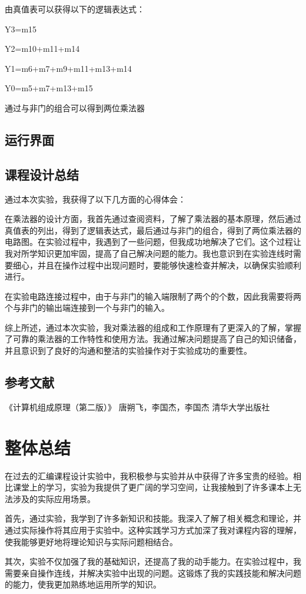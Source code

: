 \documentclass[UTF8,12pt]{article}
\begin{document}
由真值表可以获得以下的逻辑表达式：

Y3=m15

Y2=m10+m11+m14

Y1=m6+m7+m9+m11+m13+m14

Y0=m5+m7+m13+m15

通过与非门的组合可以得到两位乘法器

\subsection{运行界面}

\subsection{课程设计总结}
通过本次实验，我获得了以下几方面的心得体会：

在乘法器的设计方面，我首先通过查阅资料，了解了乘法器的基本原理，然后通过真值表的列出，得到了逻辑表达式，最后通过与非门的组合，得到了两位乘法器的电路图。在实验过程中，我遇到了一些问题，但我成功地解决了它们。这个过程让我对所学知识更加牢固，提高了自己解决问题的能力。我也意识到在实验连线时需要细心，并且在操作过程中出现问题时，要能够快速检查并解决，以确保实验顺利进行。

在实验电路连接过程中，由于与非门的输入端限制了两个的个数，因此我需要将两个与非门的输出端连接到一个与非门的输入。

综上所述，通过本次实验，我对乘法器的组成和工作原理有了更深入的了解，掌握了可靠的乘法器的工作特性和使用方法。我通过解决问题提高了自己的知识储备，并且意识到了良好的沟通和整洁的实验操作对于实验成功的重要性。

\subsection{参考文献}
《计算机组成原理（第二版）》  唐朔飞，李国杰，李国杰   清华大学出版社

\section{整体总结}
在过去的汇编课程设计实验中，我积极参与实验并从中获得了许多宝贵的经验。相比课堂上的学习，实验为我提供了更广阔的学习空间，让我接触到了许多课本上无法涉及的实际应用场景。

首先，通过实验，我学到了许多新知识和技能。我深入了解了相关概念和理论，并通过实际操作将其应用于实验中。这种实践学习方式加深了我对课程内容的理解，使我能够更好地将理论知识与实际问题相结合。

其次，实验不仅加强了我的基础知识，还提高了我的动手能力。在实验过程中，我需要亲自操作连线，并解决实验中出现的问题。这锻炼了我的实践技能和解决问题的能力，使我更加熟练地运用所学的知识。
\end{document}
